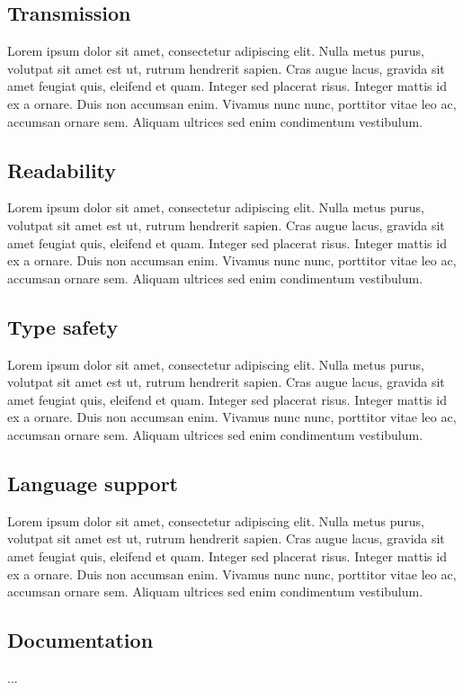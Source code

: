 \documentclass[../report.tex]{subfiles}
\begin{document}
\subsection{Transmission}

Lorem ipsum dolor sit amet, consectetur adipiscing elit. Nulla metus purus, volutpat sit amet est ut, rutrum hendrerit sapien. Cras augue lacus, gravida sit amet feugiat quis, eleifend et quam. Integer sed placerat risus. Integer mattis id ex a ornare. Duis non accumsan enim. Vivamus nunc nunc, porttitor vitae leo ac, accumsan ornare sem. Aliquam ultrices sed enim condimentum vestibulum.

\subsection{Readability}

Lorem ipsum dolor sit amet, consectetur adipiscing elit. Nulla metus purus, volutpat sit amet est ut, rutrum hendrerit sapien. Cras augue lacus, gravida sit amet feugiat quis, eleifend et quam. Integer sed placerat risus. Integer mattis id ex a ornare. Duis non accumsan enim. Vivamus nunc nunc, porttitor vitae leo ac, accumsan ornare sem. Aliquam ultrices sed enim condimentum vestibulum.

\subsection{Type safety}

Lorem ipsum dolor sit amet, consectetur adipiscing elit. Nulla metus purus, volutpat sit amet est ut, rutrum hendrerit sapien. Cras augue lacus, gravida sit amet feugiat quis, eleifend et quam. Integer sed placerat risus. Integer mattis id ex a ornare. Duis non accumsan enim. Vivamus nunc nunc, porttitor vitae leo ac, accumsan ornare sem. Aliquam ultrices sed enim condimentum vestibulum.

\subsection{Language support}

Lorem ipsum dolor sit amet, consectetur adipiscing elit. Nulla metus purus, volutpat sit amet est ut, rutrum hendrerit sapien. Cras augue lacus, gravida sit amet feugiat quis, eleifend et quam. Integer sed placerat risus. Integer mattis id ex a ornare. Duis non accumsan enim. Vivamus nunc nunc, porttitor vitae leo ac, accumsan ornare sem. Aliquam ultrices sed enim condimentum vestibulum.

\subsection{Documentation}

...
\end{document}
